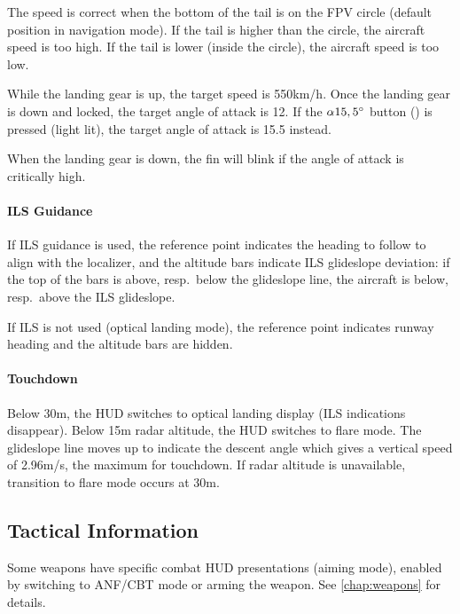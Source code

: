 The speed is correct when the bottom of the tail is on the FPV circle
(default position in navigation mode).
If the tail is higher than the circle, the aircraft speed is too high.
If the tail is lower (inside the circle), the aircraft speed is too low.

While the landing gear is up, the target speed is 550km/h.
Once the landing gear is down and locked, the target angle of attack is 12\textdegree{}.
If the $\alpha 15,5\degree$ button
() is pressed (light lit),
the target angle of attack is 15.5\textdegree{} instead.

When the landing gear is down, the fin will blink if the angle of attack is critically high.

\paragraph{ILS Guidance}
If ILS guidance is used, the reference point indicates the heading to follow to align with the localizer,
and the altitude bars indicate ILS glideslope deviation:
if the top of the bars is above, resp.\ below the glideslope line,
the aircraft is below, resp.\ above the ILS glideslope.

If ILS is not used (optical landing mode),
the reference point indicates runway heading and the altitude bars are hidden.

\paragraph{Touchdown}
Below 30m, the HUD switches to optical landing display (ILS indications disappear).
Below 15m radar altitude, the HUD switches to flare mode.
The glideslope line moves up to indicate the descent angle
which gives a vertical speed of 2.96m/s, the maximum for touchdown.
If radar altitude is unavailable, transition to flare mode occurs at 30m.

\subsection{Tactical Information}
Some weapons have specific combat HUD presentations (aiming mode),
enabled by switching to ANF/CBT mode or arming the weapon.
See \cref{chap:weapons} for details.
